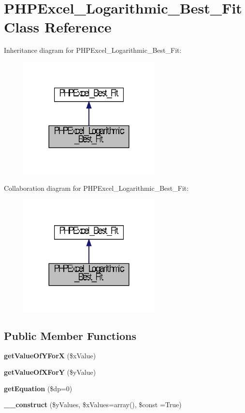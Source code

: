 \section{P\+H\+P\+Excel\+\_\+\+Logarithmic\+\_\+\+Best\+\_\+\+Fit Class Reference}
\label{class_p_h_p_excel___logarithmic___best___fit}


Inheritance diagram for P\+H\+P\+Excel\+\_\+\+Logarithmic\+\_\+\+Best\+\_\+\+Fit\+:\nopagebreak
\begin{figure}[H]
\begin{center}
\leavevmode
\includegraphics[width=204pt]{class_p_h_p_excel___logarithmic___best___fit__inherit__graph}
\end{center}
\end{figure}


Collaboration diagram for P\+H\+P\+Excel\+\_\+\+Logarithmic\+\_\+\+Best\+\_\+\+Fit\+:\nopagebreak
\begin{figure}[H]
\begin{center}
\leavevmode
\includegraphics[width=204pt]{class_p_h_p_excel___logarithmic___best___fit__coll__graph}
\end{center}
\end{figure}
\subsection*{Public Member Functions}
\begin{DoxyCompactItemize}
\item 
{\bf get\+Value\+Of\+Y\+For\+X} (\$x\+Value)
\item 
{\bf get\+Value\+Of\+X\+For\+Y} (\$y\+Value)
\item 
{\bf get\+Equation} (\$dp=0)
\item 
{\bf \+\_\+\+\_\+construct} (\$y\+Values, \$x\+Values=array(), \$const =True)
\end{DoxyCompactItemize}
